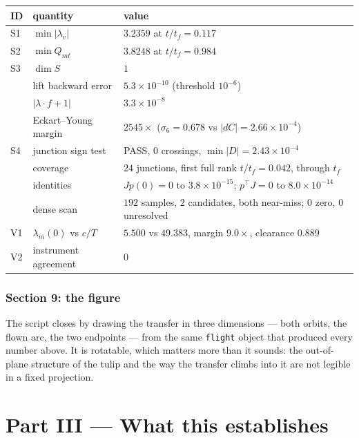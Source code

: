 \documentclass[11pt]{article}
\newcommand{\lv}{\lambda_v}\newcommand{\lr}{\lambda_r}\newcommand{\lm}{\lambda_m}
\newcommand{\tf}{t_f}\newcommand{\R}{\mathbb{R}}
\newcommand{\code}[1]{\texttt{#1}}
\newcommand{\Qmt}{Q_{mt}}
\begin{document}
\begin{ran}
\begin{tabular}{@{}lll@{}}
\toprule
ID & quantity & value \\
\midrule
S1 & $\min|\lv|$ & $3.2359$ at $t/\tf = 0.117$ \\
S2 & $\min \Qmt$ & $3.8248$ at $t/\tf = 0.984$ \\
S3 & $\dim S$ & $1$ \\
   & lift backward error & $5.3\times10^{-10}$ (threshold $10^{-6}$) \\
   & $|\lambda \cdot f + 1|$ & $3.3\times10^{-8}$ \\
   & Eckart--Young margin & $2545\times$ ($\sigma_6 = 0.678$ vs $|dC| = 2.66\times10^{-4}$) \\
S4 & junction sign test & PASS, $0$ crossings, $\min|D| = 2.43\times10^{-4}$ \\
   & coverage & $24$ junctions, first full rank $t/\tf = 0.042$, through $\tf$ \\
   & identities & $Jp(0) = 0$ to $3.8\times10^{-15}$; $p^\top J = 0$ to $8.0\times10^{-14}$ \\
   & dense scan & $192$ samples, $2$ candidates, both near-miss; $0$ zero, $0$ unresolved \\
V1 & $\lm(0)$ vs $c/T$ & $5.500$ vs $49.383$, margin $9.0\times$, clearance $0.889$ \\
V2 & instrument agreement & $0$ \\
\bottomrule
\end{tabular}
\end{ran}

\section{Section 9: the figure}\label{sec:sec9}

The script closes by drawing the transfer in three dimensions --- both orbits,
the flown arc, the two endpoints --- from the same \code{flight} object that
produced every number above. It is rotatable, which matters more than it
sounds: the out-of-plane structure of the tulip and the way the transfer climbs
into it are not legible in a fixed projection.

\part*{Part III --- What this establishes}
\end{document}
